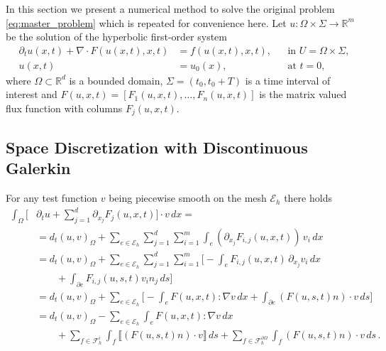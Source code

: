 \documentclass[a4paper,12pt]{article}
\theoremstyle{definition}
\theoremstyle{definition}
\newcommand{\Dim}{d}
\begin{document}
In this section we present a numerical method to solve the original
problem \eqref{eq:master_problem} which is repeated for convenience here.
Let $u: \Omega\times\Sigma\to\mathbb{R}^m$ be the solution of the
hyperbolic first-order system
\begin{subequations}
	\label{eq:master_problem_repeated}
	\begin{align}
	\partial_t u(x,t) + \nabla\cdot F(u(x,t),x,t) &= f(u(x,t),x,t), &&\text{in $U=\Omega\times\Sigma$}, \\
	u(x,t) &= u_0(x), &&\text{at $t=0$},
	\end{align}
\end{subequations}
where $\Omega\subset\mathbb{R}^{\Dim}$ is a bounded domain, $\Sigma=(t_0,t_0+T)$
is a time interval of interest and $F(u,x,t)=[F_1(u,x,t),\ldots,F_n(u,x,t)]$ is the
matrix valued flux function with columns $F_j(u,x,t)$.

\subsection{Space Discretization with Discontinuous Galerkin}

For any test function $v$ being piecewise smooth
on the mesh $\mathcal{E}_h$ there holds
\begin{equation}\label{eq:DG_identity}
\begin{split}
\int_\Omega \biggl[&\partial_t u + \sum_{j=1}^{\Dim}\partial_{x_j}F_j(u,x,t)\biggr]\cdot v \,dx = \\
&= d_t (u,v)_\Omega + \sum_{e\in\mathcal{E}_h} \sum_{j=1}^{\Dim} \sum_{i=1}^m
\int_e (\partial_{x_j}F_{i,j}(u,x,t)) \, v_i \,dx \\
&= d_t (u,v)_\Omega + \sum_{e\in\mathcal{E}_h} \sum_{j=1}^{\Dim} \sum_{i=1}^m
\biggl[ - \int_e F_{i,j}(u,x,t) \,\partial_{x_j} v_i \,dx \\
&\qquad+ \int_{\partial e} F_{i,j}(u,s,t) v_i n_j\,ds \biggr]\\
&= d_t (u,v)_\Omega + \sum_{e\in\mathcal{E}_h}  \biggl[-\int_e F(u,x,t) : \nabla v\,dx
+ \int_{\partial e} (F(u,s,t)n)\cdot v\,ds\biggr]\\
&= d_t (u,v)_\Omega - \sum_{e\in\mathcal{E}_h} \int_e F(u,x,t) : \nabla v\,dx\\
&\qquad + \sum_{f\in\mathcal{F}_h^i} \int_f \llbracket (F(u,s,t)n)\cdot v \rrbracket \,ds
+ \sum_{f\in\mathcal{F}_h^{\partial\Omega}} \int_f (F(u,s,t)n)\cdot v \,ds \,.
\end{split}
\end{equation}
\end{document}
